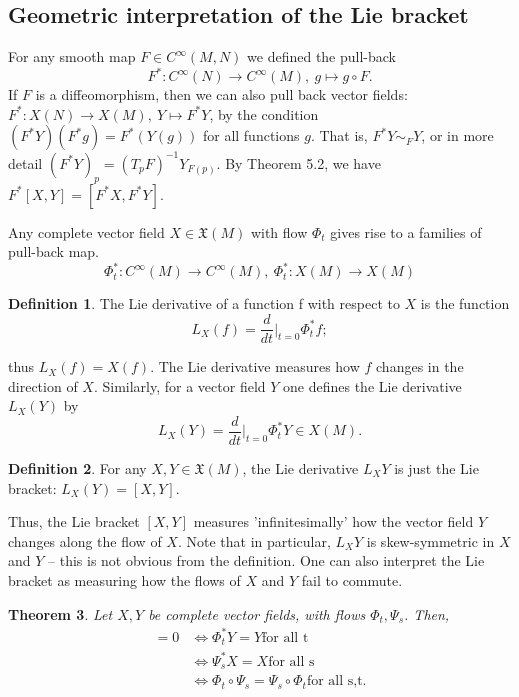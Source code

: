 \documentclass{article}
\newtheorem{theorem}{Theorem}[section]
\theoremstyle{definition}
\newtheorem{defn}[theorem]{Definition}
\newenvironment{definition}
  {\vspace{8pt}\begin{mdframed}[backgroundcolor=blueish]\begin{defn}}
  {\end{defn}\end{mdframed}\vspace{4pt}}
\begin{document}
\subsection{Geometric interpretation of the Lie bracket}

For any smooth map $F \in C^\infty(M,N)$ we defined the pull-back
\[
    F^* : C ^\infty (N) \rightarrow C ^\infty (M), \ g \mapsto g \circ F.
\]
If $F$ is a diffeomorphism, then we can also pull back vector fields: $F^* : X(N) \rightarrow X(M), \ Y \mapsto F^*Y$, by the condition $(F^*Y)(F^* g) = F^* (Y(g))$ for all functions $g$. That is, $F^* Y \sim_F Y$, or in more detail $(F^*Y)_p = (T_pF)^{ -1}Y_{F(p)}$. By Theorem 5.2, we have $F^*[X,Y] = [F^*X,F^*Y]$.


Any complete vector field $X \in \mathfrak X(M)$ with flow $\Phi_t$ gives rise to a families of pull-back map.
\[
    \Phi^*_t : C ^\infty (M) \rightarrow C^\infty (M), \  \Phi^*_t : X(M) \rightarrow X(M)
\]

\begin{definition}
The Lie derivative of a function f with respect to $X$ is the function
\[
    L_X (f) = \frac{d}{dt} \Bigr |_{t=0} \Phi^*_t f ;
\]

thus $L_X (f) = X(f)$. The Lie derivative measures how $f$ changes in the direction of $X$. Similarly, for a vector field $Y$ one defines the Lie derivative  $L_X (Y)$ by
\[
   L_X (Y) = \frac{d} {dt}\Bigr |_{t=0} \Phi^*_t Y \in X(M).
\]
\end{definition}

\begin{definition}
For any $X,Y \in \mathfrak X(M)$, the Lie derivative $L_X Y$ is just the Lie bracket: $L_X (Y) = [X,Y]$.
\end{definition}

Thus, the Lie bracket $[X,Y]$ measures 'infinitesimally' how the vector field $Y$ changes along the flow of $X$. Note that in particular, $L_XY$ is skew-symmetric in $X$ and $Y$ – this is not obvious from the definition. One can also interpret the Lie bracket as measuring how the flows of $X$ and $Y$ fail to commute.

\begin{theorem}
Let $X,Y$ be complete vector fields, with flows $\Phi_t ,\Psi_s$. Then,
\begin{align*}
    [X,Y] = 0 &\iff \Phi^*_t Y = Y \text{for all t}\\
    &\iff \Psi^*_s X = X \text{for all s} \\
    &\iff  \Phi_t \circ \Psi_s  = \Psi_s \circ \Phi_t \text{for all s,t.}
\end{align*}

\end{theorem}
\end{document}
